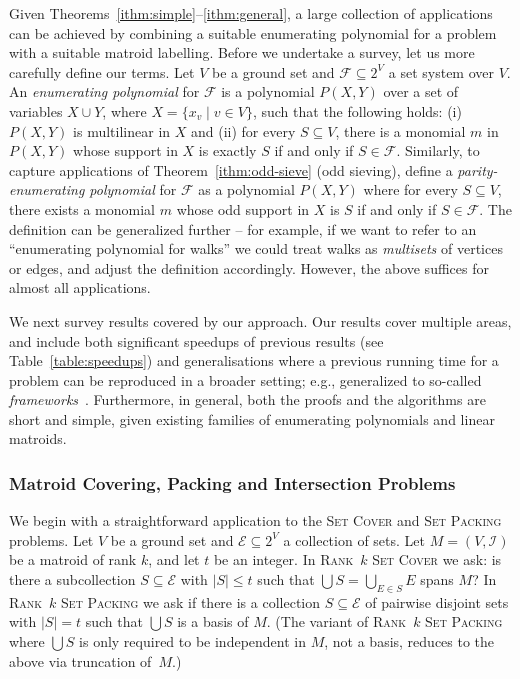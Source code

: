 \documentclass[10pt,a4paper]{article}
\newcommand{\cI}{\ensuremath{\mathcal I}\xspace}
\newcommand{\cE}{\ensuremath{\mathcal E}\xspace}
\newcommand{\cF}{\ensuremath{\mathcal F}\xspace}
\begin{document}
Given Theorems~\ref{ithm:simple}--\ref{ithm:general},
a large collection of applications can be achieved by combining a
suitable enumerating polynomial for a problem with a suitable matroid labelling. 
Before we undertake a survey, let us more carefully define our terms. 
Let $V$ be a ground set and $\cF \subseteq 2^V$ a set system over $V$.
An \emph{enumerating polynomial} for $\cF$ is a polynomial $P(X,Y)$
over a set of variables $X \cup Y$, where $X=\{x_v \mid v \in V\}$,
such that the following holds:
(i) $P(X,Y)$ is multilinear in $X$
and (ii) for every $S \subseteq V$, there is a monomial $m$ in $P(X,Y)$
  whose support in $X$ is exactly $S$ if and only if $S \in \cF$.
Similarly, to capture applications of Theorem~\ref{ithm:odd-sieve} (odd sieving),
define a \emph{parity-enumerating polynomial} for $\cF$ as a
polynomial $P(X,Y)$ where for every $S \subseteq V$, there exists a monomial $m$
whose odd support in $X$ is $S$ if and only if $S \in \cF$.
The definition can be generalized further -- for example, if we want to
refer to an ``enumerating polynomial for walks'' we could treat walks
as \emph{multisets} of vertices or edges, and adjust the definition
accordingly. However, the above suffices for almost all applications. 

We next survey results covered by our approach. Our results cover
multiple areas, and include
both significant speedups of previous results (see Table~\ref{table:speedups})
and generalisations where a previous running time for a problem can
be reproduced in a broader setting; e.g., generalized to so-called
\emph{frameworks}~\cite{FominGKSS24,Lovasz1977,LovaszGeomBook2019}.
Furthermore, in general, both
the proofs and the algorithms are short and simple,
given existing families of enumerating polynomials and linear matroids. 


\subsubsection{Matroid Covering, Packing and Intersection Problems}
\label{sec:intro-appl-matroids}
We begin with a straightforward application to the
\textsc{Set Cover} and \textsc{Set Packing} problems. 
Let $V$ be a ground set and $\cE \subseteq 2^V$ a collection of sets.
Let $M=(V,\cI)$ be a matroid of rank $k$, and let $t$ be an integer.
In \textsc{Rank~$k$ Set Cover} we ask: is there a subcollection
$S \subseteq \cE$ with $|S| \leq t$ such that $\bigcup S = \bigcup_{E \in S} E$ spans $M$?
In \textsc{Rank~$k$ Set Packing} we ask if there is
a collection $S \subseteq \cE$
of pairwise disjoint sets
with $|S|=t$ such that
$\bigcup S$ is a basis of $M$. 
(The variant of \textsc{Rank~$k$ Set Packing} where $\bigcup S$
is only required to be independent in $M$, not a basis,
reduces to the above via truncation of~$M$.)
\end{document}

